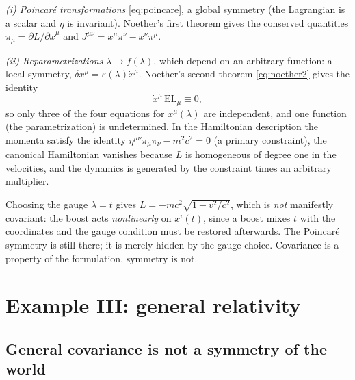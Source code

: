 \documentclass[11pt,a4paper,openany]{book}
\theoremstyle{definition}
\theoremstyle{plain}
\theoremstyle{remark}
\newcommand{\eps}{\varepsilon}
\begin{document}
\emph{(i) Poincar\'e transformations} \eqref{eq:poincare}, a global
symmetry (the Lagrangian is a scalar and $\eta$ is invariant). Noether's first
theorem gives the conserved quantities $\pi_\mu=\partial L/\partial\dot x^\mu$
and $J^{\mu\nu}=x^\mu\pi^\nu-x^\nu\pi^\mu$.

\emph{(ii) Reparametrizations} $\lambda\to f(\lambda)$, which depend on an
arbitrary function: a local symmetry, $\delta x^\mu=\eps(\lambda)\dot x^\mu$.
Noether's second theorem \eqref{eq:noether2} gives the identity
\begin{equation}\label{eq:param-identity}
  \dot x^\mu\,\mathrm{EL}_\mu\equiv0,
\end{equation}
so only three of the four equations for $x^\mu(\lambda)$ are independent, and
one function (the parametrization) is undetermined. In the Hamiltonian
description the momenta satisfy the identity
$\eta^{\mu\nu}\pi_\mu\pi_\nu-m^2c^2=0$ (a primary constraint), the canonical
Hamiltonian vanishes because $L$ is homogeneous of degree one in the
velocities, and the dynamics is generated by the constraint times an arbitrary
multiplier.

Choosing the gauge $\lambda=t$ gives
$L=-mc^2\sqrt{1-v^2/c^2}$, which is \emph{not} manifestly covariant: the
boost acts \emph{nonlinearly} on $x^i(t)$, since a boost mixes $t$ with the
coordinates and the gauge condition must be restored afterwards. The
Poincar\'e symmetry is still there; it is merely hidden by the gauge choice.
Covariance is a property of the formulation, symmetry is not.

\section{Example III: general relativity}
\label{sec:gr}

\subsection{General covariance is not a symmetry of the world}
\end{document}
